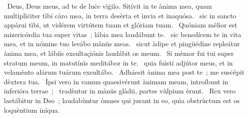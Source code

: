 ~Deus, Deus meus, ad te de luċe vìġilo. Sitívit in te ànima mea, quam multiplìċiter tìbi càro mea, in terra desèrta et ìnvia et inaquósa. 
~sic in sancto appárui tìbi, ut vidérem virtútem tuam et glóriam tuam. 
~Quóniam mèlior est mizericórdia tua super vitas~; lábia mea laudábunt te. 
~sic benedícem te in vita mea, et in nómine tuo levábo mànüs meas. 
~sicut àdipe et pingüédine repleátur ànima mea, et lábiïs exsultaçiónis laudábit os meum. 
~Si mèmor fui tui super stratum meum, in matutínïs meditábor in te. 
~quia fuìsti adjútor meus, et in velamènto alárum tuárum exsultábo. 
~Adháesit ànima mea post te~; me susċépit dèxtera tua. 
~Ìpsi vero in vanum quaesivérunt ànimam meam, introíbunt in inferióra terrae~; 
~tradèntur in mànüs glàdii, partes vùlpium èrunt. 
~Rex vero laetábitur in Deo~; laudabùntur òmnes qui jurant in eo, quia obstrùctum est os loquèntium iníqua. 
